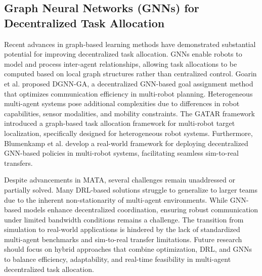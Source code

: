 \subsection{Graph Neural Networks (GNNs) for Decentralized Task Allocation}
Recent advances in graph-based learning methods have demonstrated substantial potential for improving decentralized task allocation. GNNs enable robots to model and process inter-agent relationships, allowing task allocations to be computed based on local graph structures rather than centralized control. Goarin et al. \cite{goarin2024graph} proposed DGNN-GA, a decentralized GNN-based goal assignment method that optimizes communication efficiency in multi-robot planning. Heterogeneous multi-agent systems pose additional complexities due to differences in robot capabilities, sensor modalities, and mobility constraints. The GATAR framework \cite{peng2024graph} introduced a graph-based task allocation framework for multi-robot target localization, specifically designed for heterogeneous robot systems. Furthermore, Blumenkamp et al. \cite{blumenkamp2022framework} develop a real-world framework for deploying decentralized GNN-based policies in multi-robot systems, facilitating seamless sim-to-real transfers. 

Despite advancements in MATA, several challenges remain unaddressed or partially solved. Many DRL-based solutions struggle to generalize to larger teams due to the inherent non-stationarity of multi-agent environments. While GNN-based models enhance decentralized coordination, ensuring robust communication under limited bandwidth conditions remains a challenge. The transition from simulation to real-world applications is hindered by the lack of standardized multi-agent benchmarks and sim-to-real transfer limitations. 
 Future research should focus on hybrid approaches that combine optimization, DRL, and GNNs to balance efficiency, adaptability, and real-time feasibility in multi-agent decentralized task allocation.